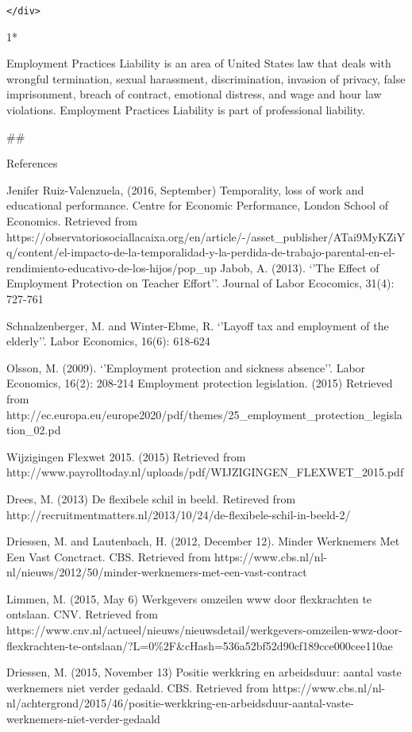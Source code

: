\documentclass[11pt]{article}
\begin{document}
\begin{verbatim}
</div>
\end{verbatim}

     1*

{ Employment Practices Liability is an area of United States law that
deals with wrongful termination, sexual harassment, discrimination,
invasion of privacy, false imprisonment, breach of contract, emotional
distress, and wage and hour law violations. Employment Practices
Liability is part of professional liability. }

    \#\#

{References}

Jenifer Ruiz-Valenzuela, (2016, September) Temporality, loss of work and
educational performance. Centre for Economic Performance, London School
of Economics. Retrieved from
https://observatoriosociallacaixa.org/en/article/-/asset\_publisher/ATai9MyKZiYq/content/el-impacto-de-la-temporalidad-y-la-perdida-de-trabajo-parental-en-el-rendimiento-educativo-de-los-hijos/pop\_up
Jabob, A. (2013). `'The Effect of Employment Protection on Teacher
Effort''. Journal of Labor Ecocomics, 31(4): 727-761

Schnalzenberger, M. and Winter-Ebme, R. `'Layoff tax and employment of
the elderly''. Labor Economics, 16(6): 618-624

Olsson, M. (2009). `'Employment protection and sickness absence''. Labor
Economics, 16(2): 208-214 Employment protection legislation. (2015)
Retrieved from
http://ec.europa.eu/europe2020/pdf/themes/25\_employment\_protection\_legislation\_02.pd

Wijzigingen Flexwet 2015. (2015) Retrieved from
http://www.payrolltoday.nl/uploads/pdf/WIJZIGINGEN\_FLEXWET\_2015.pdf

Drees, M. (2013) De flexibele schil in beeld. Retireved from
http://recruitmentmatters.nl/2013/10/24/de-flexibele-schil-in-beeld-2/

Driessen, M. and Lautenbach, H. (2012, December 12). Minder Werknemers
Met Een Vast Conctract. CBS. Retrieved from
https://www.cbs.nl/nl-nl/nieuws/2012/50/minder-werknemers-met-een-vast-contract

Limmen, M. (2015, May 6) Werkgevers omzeilen www door flexkrachten te
ontslaan. CNV. Retrieved from
https://www.cnv.nl/actueel/nieuws/nieuwsdetail/werkgevers-omzeilen-wwz-door-flexkrachten-te-ontslaan/?L=0\%2F\&cHash=536a52bf52d90cf189cce000cee110ae

Driessen, M. (2015, November 13) Positie werkkring en arbeidsduur:
aantal vaste werknemers niet verder gedaald. CBS. Retrieved from
https://www.cbs.nl/nl-nl/achtergrond/2015/46/positie-werkkring-en-arbeidsduur-aantal-vaste-werknemers-niet-verder-gedaald
\end{document}
